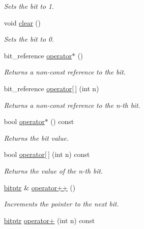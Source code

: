 \begin{DoxyCompactItemize}
\begin{DoxyCompactList}\small\item\em Sets the bit to 1. \end{DoxyCompactList}\item 
void \mbox{\hyperlink{classirk_1_1bitptr_acb0f89f9751fc114558234b79d49aac6}{clear}} ()
\begin{DoxyCompactList}\small\item\em Sets the bit to 0. \end{DoxyCompactList}\item 
bit\+\_\+reference \mbox{\hyperlink{classirk_1_1bitptr_a6676fe4fc076f0cb53587ea48d8634c3}{operator$\ast$}} ()
\begin{DoxyCompactList}\small\item\em Returns a non-\/const reference to the bit. \end{DoxyCompactList}\item 
bit\+\_\+reference \mbox{\hyperlink{classirk_1_1bitptr_a1df6b87e20b41de54fd6d582263a905d}{operator\mbox{[}$\,$\mbox{]}}} (int n)
\begin{DoxyCompactList}\small\item\em Returns a non-\/const reference to the {\ttfamily n}-\/th bit. \end{DoxyCompactList}\item 
bool \mbox{\hyperlink{classirk_1_1bitptr_a4cb8f7ff26e561a9348f79082ad6af35}{operator$\ast$}} () const
\begin{DoxyCompactList}\small\item\em Returns the bit value. \end{DoxyCompactList}\item 
bool \mbox{\hyperlink{classirk_1_1bitptr_ae7ed619d650d1982a2510ca8cdd997c1}{operator\mbox{[}$\,$\mbox{]}}} (int n) const
\begin{DoxyCompactList}\small\item\em Returns the value of the {\ttfamily n}-\/th bit. \end{DoxyCompactList}\item 
\mbox{\hyperlink{classirk_1_1bitptr}{bitptr}} \& \mbox{\hyperlink{classirk_1_1bitptr_abb1d7cadd88cb17c9d672a9653d6cbf8}{operator++}} ()
\begin{DoxyCompactList}\small\item\em Increments the pointer to the next bit. \end{DoxyCompactList}\item 
\mbox{\hyperlink{classirk_1_1bitptr}{bitptr}} \mbox{\hyperlink{classirk_1_1bitptr_ad382cd01b956b2b37d62990ca57de170}{operator+}} (int n) const

\end{DoxyCompactItemize}
